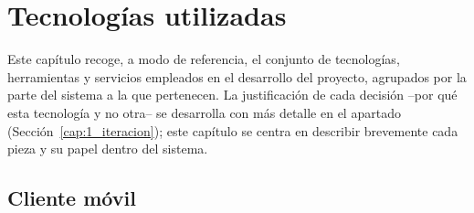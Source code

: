 \chapter{Tecnologías utilizadas}\label{cap:tecnologias}

Este capítulo recoge, a modo de referencia, el conjunto de tecnologías, herramientas y servicios empleados en el desarrollo del proyecto, agrupados por la parte del sistema a la que pertenecen. La justificación de cada decisión --por qué esta tecnología y no otra-- se desarrolla con más detalle en el apartado  (Sección~\ref{cap:1_iteracion}); este capítulo se centra en describir brevemente cada pieza y su papel dentro del sistema.

\section{Cliente móvil}

